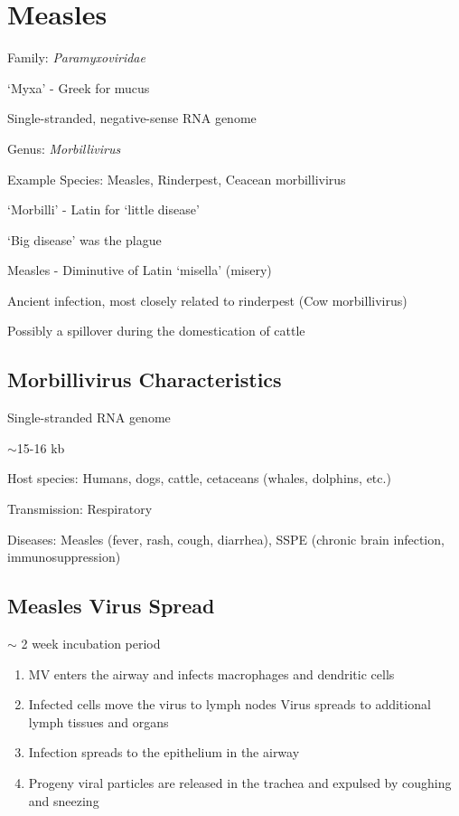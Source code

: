 \documentclass{notes}
\begin{document}
\section{Measles}

Family: \textit{Paramyxoviridae}

`Myxa' - Greek for mucus

Single-stranded, negative-sense RNA genome

Genus: \textit{Morbillivirus}

Example Species: Measles, Rinderpest, Ceacean morbillivirus

`Morbilli' - Latin for `little disease'

\tab `Big disease' was the plague

Measles - Diminutive of Latin `misella' (misery)

\tab Ancient infection, most closely related to rinderpest (Cow morbillivirus)

\tab \tab Possibly a spillover during the domestication of cattle

\subsection{Morbillivirus Characteristics}

Single-stranded RNA genome

\(\sim\)15-16 kb

Host species: Humans, dogs, cattle, cetaceans (whales, dolphins, etc.)

Transmission: Respiratory

Diseases: Measles (fever, rash, cough, diarrhea), SSPE (chronic brain infection, immunosuppression)


\subsection{Measles Virus Spread}

\(\sim\) 2 week incubation period

\begin{enumerate}
    \item MV enters the airway and infects macrophages and dendritic cells
    \item Infected cells move the virus to lymph nodes
    \subitem Virus spreads to additional lymph tissues and organs
    \item Infection spreads to the epithelium in the airway
    \item Progeny viral particles are released in the trachea and expulsed by coughing and sneezing
\end{enumerate}
\end{document}
